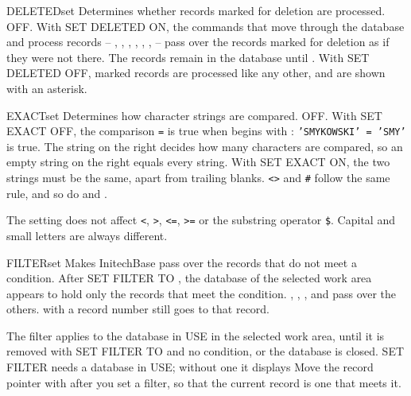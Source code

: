\begin{XbaseEntry}{DELETED}{set}
Determines whether records marked for deletion are processed.
\Syntax
{}
\Defaults
OFF.
\Usage
With SET DELETED ON, the commands that move through the database and process
records -- , , , ,
, ,  -- pass over the records marked for
deletion as if they were not there.  The records remain in the database until
.  With SET DELETED OFF, marked records are processed like any
other, and are shown with an asterisk.
\Examples
{}
\end{XbaseEntry}

\begin{XbaseEntry}{EXACT}{set}
Determines how character strings are compared.
\Syntax
{}
\Defaults
OFF.
\Usage
With SET EXACT OFF, the comparison  \texttt{=}  is true
when  begins with : \texttt{'SMYKOWSKI' = 'SMY'} is true.
The string on the right decides how many characters are compared, so an empty
string on the right equals every string.  With SET EXACT ON, the two strings
must be the same, apart from trailing blanks.  \texttt{<>} and \texttt{\#}
follow the same rule, and so do  and .

The setting does not affect \texttt{<}, \texttt{>}, \texttt{<=}, \texttt{>=} or
the substring operator \texttt{\$}.  Capital and small letters are always
different.
\Examples
{}
\end{XbaseEntry}

\begin{XbaseEntry}{FILTER}{set}
Makes InitechBase pass over the records that do not meet a condition.
\Syntax
{}
\Usage
After SET FILTER TO , the database of the selected work area
appears to hold only the records that meet the condition.  ,
, ,  and  pass over the others.
 with a record number still goes to that record.

The filter applies to the database in USE in the selected work area, until it
is removed with SET FILTER TO and no condition, or the database is closed.
SET FILTER needs a database in USE; without one it displays
\Tips
Move the record pointer with  after you set a filter, so that the
current record is one that meets it.
\Examples
{}
\end{XbaseEntry}

